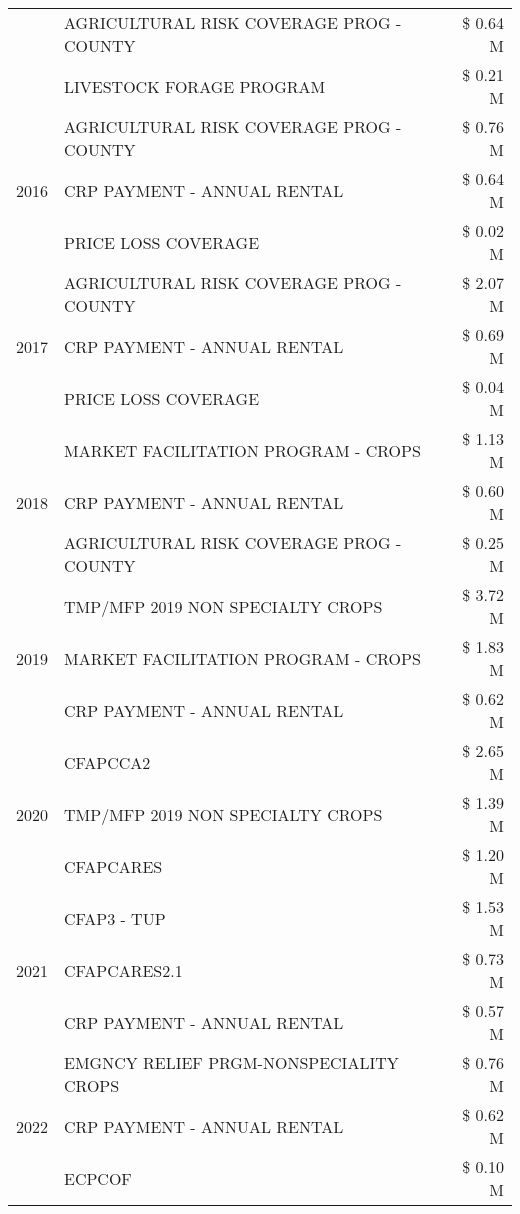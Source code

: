 \begin{tabular}{llr}
 & AGRICULTURAL RISK COVERAGE PROG - COUNTY & \$ 0.64 M \\
 & LIVESTOCK FORAGE PROGRAM & \$ 0.21 M \\
\cline{1-3}
\multirow[t]{3}{*}{2016} & AGRICULTURAL RISK COVERAGE PROG - COUNTY & \$ 0.76 M \\
 & CRP PAYMENT - ANNUAL RENTAL & \$ 0.64 M \\
 & PRICE LOSS COVERAGE & \$ 0.02 M \\
\cline{1-3}
\multirow[t]{3}{*}{2017} & AGRICULTURAL RISK COVERAGE PROG - COUNTY & \$ 2.07 M \\
 & CRP PAYMENT - ANNUAL RENTAL & \$ 0.69 M \\
 & PRICE LOSS COVERAGE & \$ 0.04 M \\
\cline{1-3}
\multirow[t]{3}{*}{2018} & MARKET FACILITATION PROGRAM - CROPS & \$ 1.13 M \\
 & CRP PAYMENT - ANNUAL RENTAL & \$ 0.60 M \\
 & AGRICULTURAL RISK COVERAGE PROG - COUNTY & \$ 0.25 M \\
\cline{1-3}
\multirow[t]{3}{*}{2019} & TMP/MFP 2019 NON SPECIALTY CROPS & \$ 3.72 M \\
 & MARKET FACILITATION PROGRAM - CROPS & \$ 1.83 M \\
 & CRP PAYMENT - ANNUAL RENTAL & \$ 0.62 M \\
\cline{1-3}
\multirow[t]{3}{*}{2020} & CFAPCCA2 & \$ 2.65 M \\
 & TMP/MFP 2019 NON SPECIALTY CROPS & \$ 1.39 M \\
 & CFAPCARES & \$ 1.20 M \\
\cline{1-3}
\multirow[t]{3}{*}{2021} & CFAP3 - TUP & \$ 1.53 M \\
 & CFAPCARES2.1 & \$ 0.73 M \\
 & CRP PAYMENT - ANNUAL RENTAL & \$ 0.57 M \\
\cline{1-3}
\multirow[t]{3}{*}{2022} & EMGNCY RELIEF PRGM-NONSPECIALITY CROPS & \$ 0.76 M \\
 & CRP PAYMENT - ANNUAL RENTAL & \$ 0.62 M \\
 & ECPCOF & \$ 0.10 M \\
\cline{1-3}
\bottomrule
\end{tabular}
